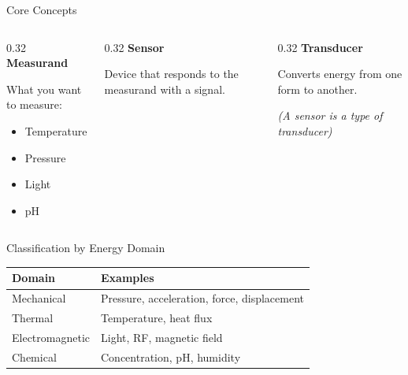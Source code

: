 \documentclass[aspectratio=169,11pt]{beamer}
\begin{document}
\begin{frame}{Core Concepts}
    \begin{columns}[T]
        \begin{column}{0.32\textwidth}
            \textbf{Measurand}
            
            What you want to measure:
            \begin{itemize}
                \item Temperature
                \item Pressure
                \item Light
                \item pH
            \end{itemize}
        \end{column}
        \begin{column}{0.32\textwidth}
            \textbf{Sensor}
            
            Device that responds to the measurand with a signal.
        \end{column}
        \begin{column}{0.32\textwidth}
            \textbf{Transducer}
            
            Converts energy from one form to another.
            
            \vspace{0.2cm}
            \textit{(A sensor is a type of transducer)}
        \end{column}
    \end{columns}
    
    \vspace{0.5cm}
    \footnotesize
    \cite{fraden2016handbook}
\end{frame}

\begin{frame}{Classification by Energy Domain}
    \begin{table}
        \centering
        \begin{tabular}{ll}
            \toprule
            \textbf{Domain} & \textbf{Examples} \\
            \midrule
            Mechanical & Pressure, acceleration, force, displacement \\
            Thermal & Temperature, heat flux \\
            Electromagnetic & Light, RF, magnetic field \\
            Chemical & Concentration, pH, humidity \\
            \bottomrule
        \end{tabular}
    \end{table}
    
    \vspace{0.5cm}
    \footnotesize
    \cite{pallasareny2012sensors}
\end{frame}
\end{document}

